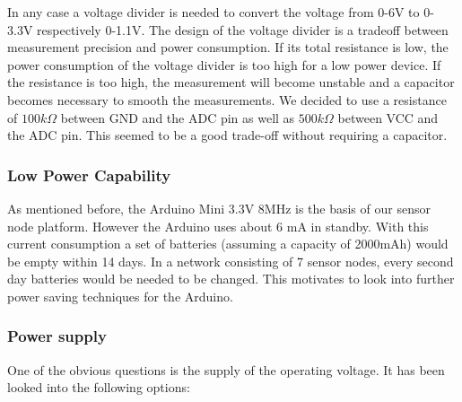 \begin{itemize}
In any case a voltage divider is needed to convert the voltage from 0-6V to 0-3.3V respectively 0-1.1V. The design of the voltage divider is a trade\-off between measurement precision and power consumption. \cite{misc:battery_voltage_measurement} If its total resistance is low, the power consumption of the voltage divider is too high for a low power device. If the resistance is too high, the measurement will become unstable and a capacitor becomes necessary to smooth the measurements. We decided to use a resistance of $100k\Omega$ between GND and the ADC pin as well as $500k\Omega$ between VCC and the ADC pin. This seemed to be a good trade-off without requiring a capacitor.







\end{itemize}


\subsubsection{Low Power Capability}
\label{sec:lowpower}

As mentioned before, the Arduino Mini 3.3V 8MHz is the basis of our sensor node platform. However the Arduino uses about 6 mA in standby. With this current consumption a set of batteries (assuming a capacity of 2000mAh) would be empty within 14 days. In a network consisting of 7 sensor nodes, every second day batteries would be needed to be changed. This motivates to look into further power saving techniques for the Arduino.\\

\subsubsection{Power supply}

One of the obvious questions is the supply of the operating voltage. It has been looked into the following options:

